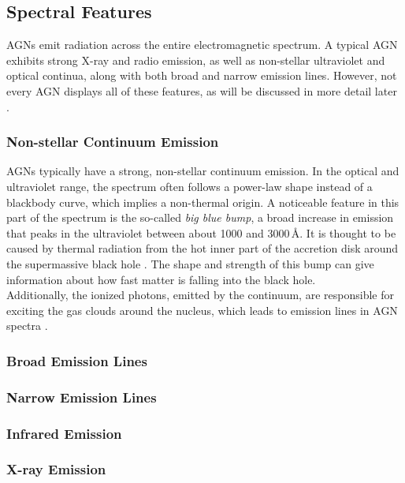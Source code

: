 \subsection{Spectral Features}
\label{sec:spectral_features}

AGNs emit radiation across the entire electromagnetic spectrum. A typical AGN exhibits strong X-ray and radio emission, as well as non-stellar ultraviolet and optical continua, along with both broad and narrow emission lines. However, not every AGN displays all of these features, as will be discussed in more detail later \parencite{peterson1997introduction}.
\subsubsection{Non-stellar Continuum Emission}
AGNs typically have a strong, non-stellar continuum emission. In the optical and ultraviolet range, the spectrum often follows a power-law shape instead of a blackbody curve, which implies a non-thermal origin. A noticeable feature in this part of the spectrum is the so-called \emph{big blue bump}, a broad increase in emission that peaks in the ultraviolet between about 1000 and 3000\,\AA. It is thought to be caused by thermal radiation from the hot inner part of the accretion disk around the supermassive black hole \parencite{peterson1997introduction, osterbrock1989agn}. The shape and strength of this bump can give information about how fast matter is falling into the black hole. \\
Additionally, the ionized photons, emitted by the continuum, are responsible for exciting the gas clouds around the nucleus, which leads to emission lines in AGN spectra \parencite{osterbrock1989agn}.

\subsubsection{Broad Emission Lines}


\subsubsection{Narrow Emission Lines}


\subsubsection{Infrared Emission}


\subsubsection{X-ray Emission}



